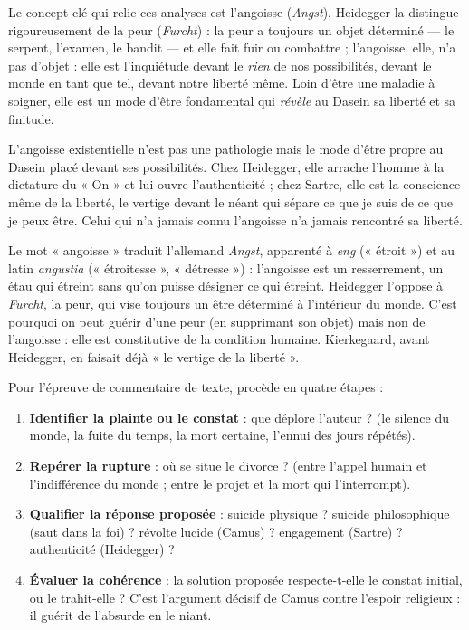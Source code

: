 \documentclass[11pt]{article}
\newcommand{\cle}[1]{{\popxbold\color{popdark}#1}}
\begin{document}
Le concept-clé qui relie ces analyses est l'\cle{angoisse} (\emph{Angst}). Heidegger la distingue rigoureusement de la peur (\emph{Furcht}) : la peur a toujours un objet déterminé — le serpent, l'examen, le bandit — et elle fait fuir ou combattre ; l'angoisse, elle, n'a pas d'objet : elle est l'inquiétude devant le \emph{rien} de nos possibilités, devant le monde en tant que tel, devant notre liberté même. Loin d'être une maladie à soigner, elle est un mode d'être fondamental qui \emph{révèle} au Dasein sa liberté et sa finitude.

\begin{propriete}
L'angoisse existentielle n'est pas une pathologie mais le mode d'être propre au Dasein placé devant ses possibilités. Chez Heidegger, elle arrache l'homme à la dictature du « On » et lui ouvre l'authenticité ; chez Sartre, elle est la conscience même de la liberté, le vertige devant le néant qui sépare ce que je suis de ce que je peux être. Celui qui n'a jamais connu l'angoisse n'a jamais rencontré sa liberté.
\end{propriete}

\begin{savaistu}
Le mot « angoisse » traduit l'allemand \emph{Angst}, apparenté à \emph{eng} (« étroit ») et au latin \emph{angustia} (« étroitesse », « détresse ») : l'angoisse est un resserrement, un étau qui étreint sans qu'on puisse désigner ce qui étreint. Heidegger l'oppose à \emph{Furcht}, la peur, qui vise toujours un être déterminé à l'intérieur du monde. C'est pourquoi on peut guérir d'une peur (en supprimant son objet) mais non de l'angoisse : elle est constitutive de la condition humaine. Kierkegaard, avant Heidegger, en faisait déjà « le vertige de la liberté ».
\end{savaistu}

\begin{methode}
Pour l'épreuve de commentaire de texte, procède en quatre étapes :
\begin{enumerate}
\item \textbf{Identifier la plainte ou le constat} : que déplore l'auteur ? (le silence du monde, la fuite du temps, la mort certaine, l'ennui des jours répétés).
\item \textbf{Repérer la rupture} : où se situe le divorce ? (entre l'appel humain et l'indifférence du monde ; entre le projet et la mort qui l'interrompt).
\item \textbf{Qualifier la réponse proposée} : suicide physique ? suicide philosophique (saut dans la foi) ? révolte lucide (Camus) ? engagement (Sartre) ? authenticité (Heidegger) ?
\item \textbf{Évaluer la cohérence} : la solution proposée respecte-t-elle le constat initial, ou le trahit-elle ? C'est l'argument décisif de Camus contre l'espoir religieux : il guérit de l'absurde en le niant.
\end{enumerate}
\end{methode}
\end{document}
